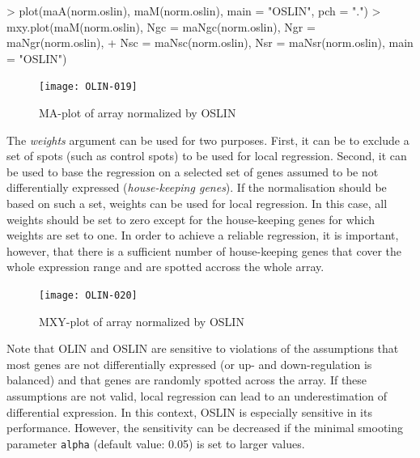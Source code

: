 \documentclass[a4paper,11pt]{article}
\begin{document}

\begin{Schunk}
\begin{Sinput}
> plot(maA(norm.oslin), maM(norm.oslin), main = "OSLIN", pch = ".")
> mxy.plot(maM(norm.oslin), Ngc = maNgc(norm.oslin), Ngr = maNgr(norm.oslin), 
 + Nsc = maNsc(norm.oslin), Nsr = maNsr(norm.oslin), main = "OSLIN")
\end{Sinput}
\end{Schunk}



\begin{figure}
\centering
\texttt{[image: OLIN-019]}
\caption{MA-plot of array normalized by  OSLIN }
\label{maoslin}
\end{figure}

The \emph{weights} argument can be used for two purposes. First, it can be 
to exclude a set of spots (such as control spots)  to be used  for local regression. Second, it can be used 
to base the regression on a selected set of genes assumed to be not differentially expressed (\emph{house-keeping
genes}).  
If the normalisation should be based on such a set, weights can be used for local regression. 
In this case, all weights should be  set to zero except for
the house-keeping genes for which weights are set to one. In order to achieve a reliable regression, it is important, however, that there is a sufficient number of house-keeping genes that  cover the whole expression range
and are spotted accross the whole array.



\begin{figure}
\centering
\texttt{[image: OLIN-020]}
\caption{MXY-plot of array normalized by  OSLIN }
\label{mxyoslin}
\end{figure}

Note that OLIN and OSLIN
are sensitive to violations of the assumptions that
 most genes are not differentially expressed (or up- and down-regulation
is balanced) and that genes are randomly spotted across the array. 
If these assumptions are not valid, local
regression can lead to an underestimation of differential expression.  
In this context,  OSLIN is especially sensitive in its performance. However, the
sensitivity can be decreased if the minimal smooting parameter \texttt{alpha} (default value: 0.05)
 is set to larger values. 
 
\end{document}
